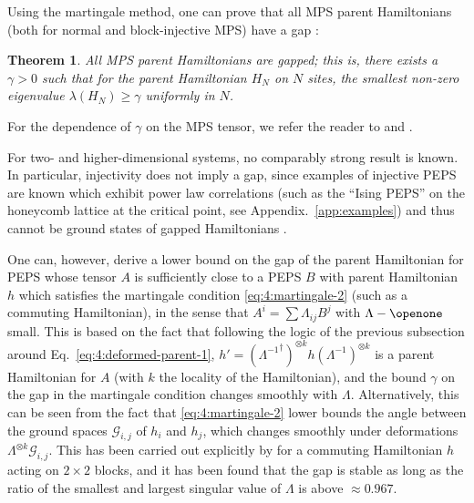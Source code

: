 \documentclass[rmp,aps,reprint,superscriptaddress,nobalancelastpage]{revtex4-1}
\newtheorem{thm}{Theorem}[section]
\begin{document}
    Using the martingale method, one can prove that all MPS parent Hamiltonians (both for normal and block-injective MPS) have a gap \cite{fannes:FCS,nachtergaele:degen-mps}:
    \begin{thm}
        All MPS parent Hamiltonians are gapped; this is, there exists a $\gamma>0$ such that for the parent Hamiltonian $H_N$ on $N$ sites, the smallest non-zero eigenvalue $\lambda(H_N)\ge \gamma$ uniformly in $N$.
    \end{thm}
    For the dependence of $\gamma$ on the MPS tensor, we refer the reader to \citet*{fannes:FCS} and \textcite{nachtergaele:degen-mps}.

    For two- and higher-dimensional systems, no comparably strong result is known. In particular, injectivity does not imply a gap, since examples of injective PEPS are known which exhibit power law correlations (such as the ``Ising PEPS'' \cite{verstraete:comp-power-of-peps} on the honeycomb lattice at the critical point, see Appendix.~\ref{app:examples}) and thus cannot be ground states of gapped Hamiltonians \cite{hastings:gap-and-expdecay,nachtergaele:exp-clustering}.

    One can, however, derive a lower bound on the gap of the parent Hamiltonian for PEPS whose tensor $A$ is sufficiently close to a PEPS $B$ with parent Hamiltonian $h$ which satisfies the martingale condition \eqref{eq:4:martingale-2} (such as a commuting Hamiltonian), in the sense that $A^i=\sum\Lambda_{ij} B^j$ with $\Lambda-\openone$ small. This is based on the fact that following the logic of the previous subsection around Eq.~\eqref{eq:4:deformed-parent-1}, $h'=({\Lambda^{-1}}^\dagger)^{\otimes k}h(\Lambda^{-1})^{\otimes k}$ is a parent Hamiltonian for $A$ (with $k$ the locality of the Hamiltonian), and the bound $\gamma$ on the gap in the martingale condition changes smoothly with $\Lambda$. Alternatively, this can be seen from the fact that \eqref{eq:4:martingale-2} lower bounds the angle between the ground spaces $\mathcal G_{i,j}$ of $h_i$ and $h_j$, which changes smoothly under deformations $\Lambda^{\otimes k}\mathcal G_{i,j}$. This has been carried out explicitly by \textcite[][Appendix E]{schuch:mps-phases} for a commuting Hamiltonian $h$ acting on $2\times 2$ blocks, and it has been found that the gap is stable as long as the ratio of the smallest and largest singular value of $\Lambda$ is above $\approx 0.967$.
\end{document}
